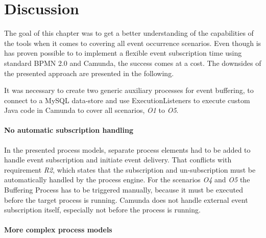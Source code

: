 


\section{Discussion}
The goal of this chapter was to get a better understanding of the capabilities of the tools when it comes to covering all event occurrence scenarios. 
Even though is has proven possible to to implement a flexible event subscription time using standard BPMN 2.0 and Camunda, the success comes at a cost.
The downsides of the presented approach are presented in the following.

It was necessary to create two generic auxiliary processes for event buffering, to connect to a MySQL data-store and use ExecutionListeners to execute custom Java code in Camunda to cover all scenarios, \textit{O1} to \textit{O5}.



\paragraph{No automatic subscription handling\newline}

In the presented process models, separate process elements had to be added to handle event subscription and initiate event delivery. 
That conflicts with requirement \textit{R2}, which states that the subscription and un-subscription must be automatically handled by the process engine.
For the scenarios \textit{O4} and \textit{O5} the Buffering Process has to be triggered manually, because it must be executed before the target process is running. Camunda does not handle external event subscription itself, especially not before the process is running.

\paragraph{More complex process models\newline}

